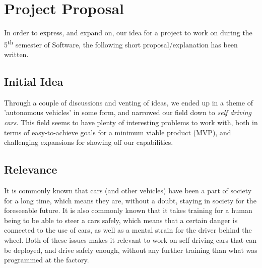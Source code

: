 




%  
%  

%


\chapter*{Project Proposal}
In order to express, and expand on, our idea for a project to work on during the 5\textsuperscript{th} semester of Software, the following short proposal/explanation has been written.

\section*{Initial Idea}
Through a couple of discussions and venting of ideas, we ended up in a theme of 'autonomous vehicles' in some form, and narrowed our field down to \textit{self driving cars}.
This field seems to have plenty of interesting problems to work with, both in terms of easy-to-achieve goals for a minimum viable product (MVP), and challenging expansions for showing off our capabilities.

\section*{Relevance}
It is commonly known that cars (and other vehicles) have been a part of society for a long time, which means they are, without a doubt, staying in society for the foreseeable future.
It is also commonly known that it takes training for a human being to be able to steer a cars safely, which means that a certain danger is connected to the use of cars, as well as a mental strain for the driver behind the wheel.
Both of these issues makes it relevant to work on self driving cars that can be deployed, and drive safely enough, without any further training than what was programmed at the factory.

